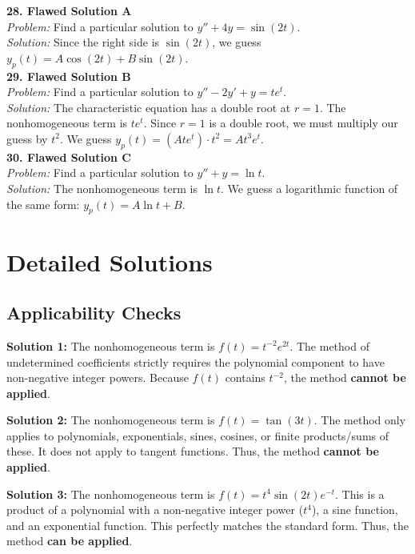 \documentclass[11pt]{article}
\begin{document}
\noindent \textbf{28. Flawed Solution A} \\
\textit{Problem:} Find a particular solution to $y'' + 4y = \sin(2t)$. \\
\textit{Solution:} Since the right side is $\sin(2t)$, we guess $y_p(t) = A\cos(2t) + B\sin(2t)$. \\

\noindent \textbf{29. Flawed Solution B} \\
\textit{Problem:} Find a particular solution to $y'' - 2y' + y = t e^t$. \\
\textit{Solution:} The characteristic equation has a double root at $r=1$. The nonhomogeneous term is $te^t$. Since $r=1$ is a double root, we must multiply our guess by $t^2$. We guess $y_p(t) = (Ate^t) \cdot t^2 = At^3e^t$. \\

\noindent \textbf{30. Flawed Solution C} \\
\textit{Problem:} Find a particular solution to $y'' + y = \ln t$. \\
\textit{Solution:} The nonhomogeneous term is $\ln t$. We guess a logarithmic function of the same form: $y_p(t) = A\ln t + B$.

\newpage

\section{Detailed Solutions}

\subsection*{Applicability Checks}

\textbf{Solution 1:} 
The nonhomogeneous term is $f(t) = t^{-2}e^{2t}$. The method of undetermined coefficients strictly requires the polynomial component to have non-negative integer powers. Because $f(t)$ contains $t^{-2}$, the method \textbf{cannot be applied}.

\textbf{Solution 2:} 
The nonhomogeneous term is $f(t) = \tan(3t)$. The method only applies to polynomials, exponentials, sines, cosines, or finite products/sums of these. It does not apply to tangent functions. Thus, the method \textbf{cannot be applied}.

\textbf{Solution 3:} 
The nonhomogeneous term is $f(t) = t^4 \sin(2t) e^{-t}$. This is a product of a polynomial with a non-negative integer power ($t^4$), a sine function, and an exponential function. This perfectly matches the standard form. Thus, the method \textbf{can be applied}.
\end{document}
